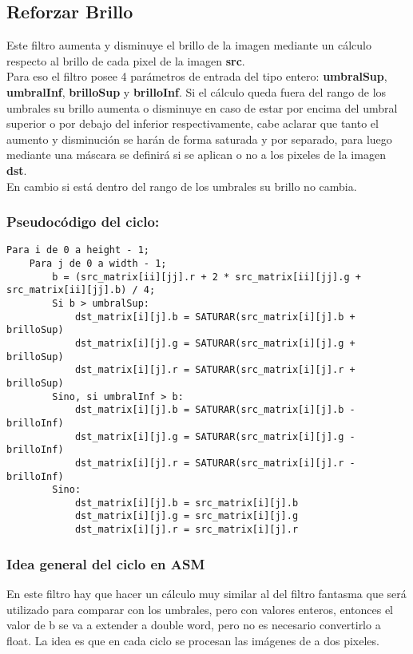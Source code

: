 \subsection{Reforzar Brillo}
Este filtro aumenta y disminuye el brillo de la imagen mediante un cálculo respecto al brillo de cada pixel de la imagen \textbf{src}. \\
Para eso el filtro posee 4 parámetros de entrada del tipo entero: \textbf{umbralSup}, \textbf{umbralInf}, \textbf{brilloSup} y \textbf{brilloInf}. Si el cálculo queda fuera del rango de los umbrales su brillo aumenta o disminuye en caso de estar por encima del umbral superior o por debajo del inferior respectivamente, cabe aclarar que tanto el aumento y disminución se harán de forma saturada y por separado, para luego mediante una máscara se definirá si se aplican o no a los pixeles de la imagen \textbf{dst}. \\
En cambio si está dentro del rango de los umbrales su brillo no cambia.

\subsubsection{Pseudocódigo del ciclo:}
\begin{codesnippet}
\begin{verbatim}
Para i de 0 a height - 1;
    Para j de 0 a width - 1; 
        b = (src_matrix[ii][jj].r + 2 * src_matrix[ii][jj].g + src_matrix[ii][jj].b) / 4;
        Si b > umbralSup:
            dst_matrix[i][j].b = SATURAR(src_matrix[i][j].b + brilloSup)
            dst_matrix[i][j].g = SATURAR(src_matrix[i][j].g + brilloSup)
            dst_matrix[i][j].r = SATURAR(src_matrix[i][j].r + brilloSup)
        Sino, si umbralInf > b:
            dst_matrix[i][j].b = SATURAR(src_matrix[i][j].b - brilloInf)
            dst_matrix[i][j].g = SATURAR(src_matrix[i][j].g - brilloInf)
            dst_matrix[i][j].r = SATURAR(src_matrix[i][j].r - brilloInf)
        Sino:
            dst_matrix[i][j].b = src_matrix[i][j].b
            dst_matrix[i][j].g = src_matrix[i][j].g
            dst_matrix[i][j].r = src_matrix[i][j].r
\end{verbatim}
\end{codesnippet}

\subsubsection{Idea general del ciclo en ASM}
En este filtro hay que hacer un cálculo muy similar al del filtro fantasma que será utilizado para comparar con los umbrales, pero con valores enteros, entonces el valor de b se va a extender a double word, pero no es necesario convertirlo a float.
La idea es que en cada ciclo se procesan las imágenes de a dos pixeles. \\

